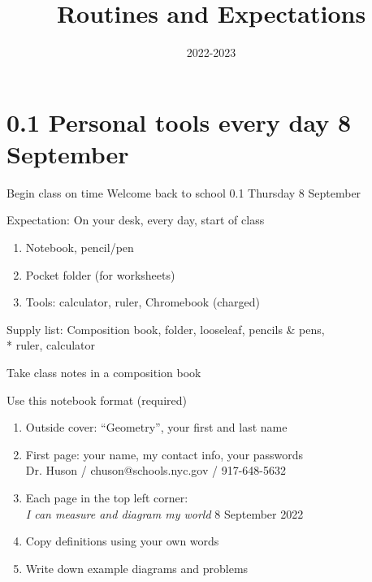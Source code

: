 

\title{Routines and Expectations}
\date{2022-2023}


\frame{\titlepage}


\section{0.1 Personal tools every day \hfill 8 September}
\begin{frame}{Begin class on time}
  {Welcome back to school \hfill \alert{0.1 Thursday 8 September}}
  \begin{block}{Expectation: On your desk, every day, start of class}
  \begin{enumerate}
      \item Notebook, pencil/pen
      \item Pocket folder (for worksheets)
      \item Tools: calculator, ruler, Chromebook (charged)
  \end{enumerate}
  \end{block}
  Supply list: Composition book, folder, looseleaf, pencils \& pens, \\*
  ruler, calculator
  \end{frame}

\begin{frame}{Take class notes in a composition book}
  \begin{block}{Use this notebook format (required)}
    \begin{enumerate}
      \item Outside cover: ``Geometry'', your first and last name
      \item First page: your name, my contact info, your passwords \\
      \qquad Dr. Huson / chuson@schools.nyc.gov / 917-648-5632 \vspace{0.25cm}
      \item Each page in the top left corner: \\
      \emph{I can measure and diagram my world} \hfill 8 September 2022 \vspace{0.25cm}
      \item Copy definitions using your own words
      \item Write down example diagrams and problems
    \end{enumerate}
    \end{block}
  \end{frame}

